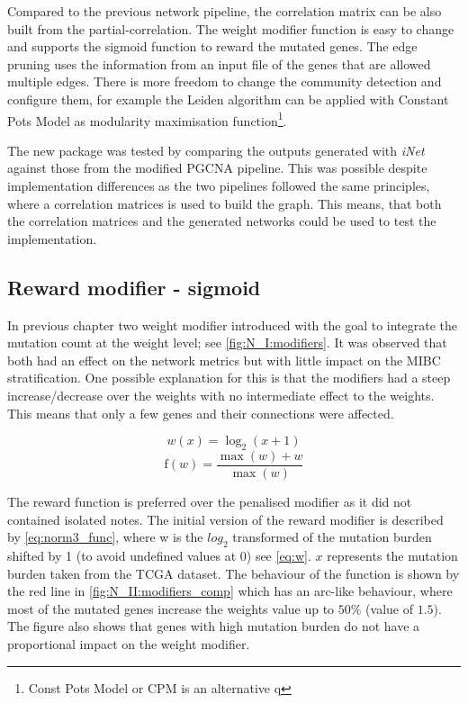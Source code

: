 Compared to the previous network pipeline, the correlation matrix can be also built from the partial-correlation. The weight modifier function is easy to change and supports the sigmoid function to reward the mutated genes. The edge pruning uses the information from an input file of the genes that are allowed multiple edges. There is more freedom to change the community detection and configure them, for example the Leiden algorithm can be applied with Constant Pots Model as modularity maximisation function\footnote{Const Pots Model or CPM is an alternative q}.

The new package was tested by comparing the outputs generated with \textit{iNet} against those from the modified PGCNA pipeline. This was possible despite implementation differences as the two pipelines followed the same principles, where a correlation matrices is used to build the graph. This means, that both the correlation matrices and the generated networks could be used to test the implementation.

\subsection*{Reward modifier - sigmoid} \label{s:N_II:reward}

In previous chapter two weight modifier introduced with the goal to integrate the mutation count at the weight level; see \cref{fig:N_I:modifiers}. It was observed that both had an effect on the network metrics but with little impact on the MIBC stratification. One possible explanation for this is that the modifiers had a steep increase/decrease over the weights with no intermediate effect to the weights. This means that only a few genes and their connections were affected.

\begin{equation} \label{eq:w}
    w(x) = \log_2(x+1)
\end{equation}
\begin{equation} \label{eq:norm3_func}
\text{f}(w) = \frac{\max(w) + w}{\max(w)}
\end{equation}

The reward function is preferred over the penalised modifier as it did not contained isolated notes. The initial version of the reward modifier is described by \cref{eq:norm3_func}, where w is the $log_2$ transformed of the mutation burden shifted by 1 (to avoid undefined values at 0) see \cref{eq:w}. $x$ represents the mutation burden taken from the TCGA dataset.  The behaviour of the function is shown by the red line in \cref{fig:N_II:modifiers_comp} which has an arc-like behaviour, where most of the mutated genes increase the weights value up to $50\%$ (value of $1.5$). The figure also shows that genes with high mutation burden do not have a proportional impact on the weight modifier.

